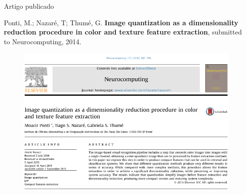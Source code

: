 \documentclass{beamer}
\begin{document}
\begin{frame}{Artigo publicado}
  \setlength\leftmargini{1em}

  \begin{block}{}
    \justifying
    \tiny{
    Ponti, M.; Nazaré, T; Thumé, G. \textbf{Image quantization as a dimensionality reduction procedure in color and texture feature extraction}, submitted to Neurocomputing, 2014.}
  \end{block}
  \begin{figure}
    \begin{center}
      \includegraphics[width=0.7\linewidth]{figuras/artigo.png}
    \end{center}
  \end{figure}
\end{frame}
\end{document}
